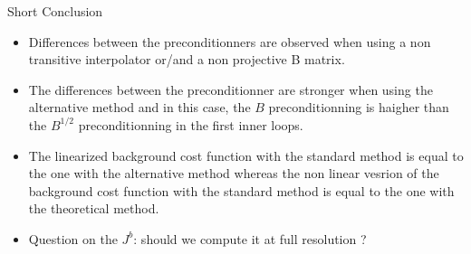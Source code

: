 \documentclass[francais]{beamer}
\begin{document}
\begin{frame}{Short Conclusion}
\begin{itemize}
\item Differences between the preconditionners are observed when using a non transitive interpolator or/and a non projective B matrix.\\
\item The differences between the preconditionner are stronger when using the alternative method and in this case, the $B$ preconditionning is haigher than the $B^{1/2}$ preconditionning in the first inner loops.
\item The linearized background cost function with the standard method is equal to the one with the alternative method whereas the non linear vesrion of the background cost function with the standard method is equal to the one with the theoretical method.
\item Question on the $J^b$: should we compute it at full resolution ?
\end{itemize}
\end{frame}


\usebackgroundtemplate{}
\end{document}
